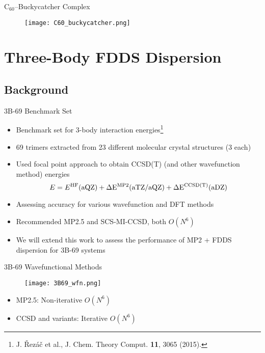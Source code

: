 \documentclass{beamer}
\begin{document}
        \begin{frame}{C$_{60}$--Buckycatcher Complex}
            \begin{figure}
                \centering
                \texttt{[image: C60\_buckycatcher.png]}
            \end{figure}
        \end{frame}

\section{Three-Body FDDS Dispersion}

    \subsection{Background}
    
        \begin{frame}{3B-69 Benchmark Set}
            \begin{itemize}
                \item Benchmark set for 3-body interaction energies\footnote{J. \v{R}ez\'{a}\v{c} et al., J. Chem. Theory Comput. \textbf{11}, 3065 (2015).}
                \item 69 trimers extracted from 23 different molecular crystal structures (3 each)
                \item Used focal point approach to obtain CCSD(T) (and other wavefunction method) energies
                $$E = E^{\rm{HF}}(\rm{aQZ}) + \Delta E^{\rm{MP2}}(\rm{aTZ/aQZ}) + \Delta E^{\rm{CCSD(T)}}(\rm{aDZ}) $$   
                \item Assessing accuracy for various wavefunction and DFT methods 
                \item Recommended MP2.5 and SCS-MI-CCSD, both $O(N^6)$
                \item We will extend this work to assess the performance of MP2 + FDDS dispersion for 3B-69 systems
            \end{itemize}   
        \end{frame}

        \begin{frame}{3B-69 Wavefunctional Methods}
            \begin{figure}
                \centering
                \texttt{[image: 3B69\_wfn.png]}
            \end{figure}
            \begin{itemize}
                \item MP2.5: Non-iterative $O(N^6)$
                \item CCSD and variants: Iterative $O(N^6)$
            \end{itemize}
        \end{frame}
\end{document}
